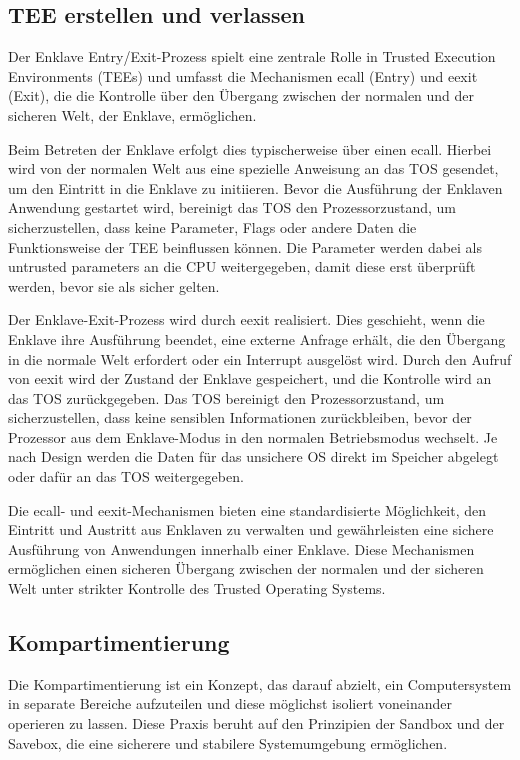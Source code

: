 \subsection{TEE erstellen und verlassen}
Der Enklave Entry/Exit-Prozess spielt eine zentrale Rolle in Trusted Execution Environments (TEEs) und umfasst die Mechanismen ecall (Entry) und eexit (Exit), die die Kontrolle über den Übergang zwischen der normalen und der sicheren Welt, der Enklave, ermöglichen.

Beim Betreten der Enklave erfolgt dies typischerweise über einen ecall. Hierbei wird von der normalen Welt aus eine spezielle Anweisung an das TOS gesendet, um den Eintritt in die Enklave zu initiieren. Bevor die Ausführung der Enklaven Anwendung gestartet wird, bereinigt das TOS den Prozessorzustand, um sicherzustellen, dass keine Parameter, Flags oder andere Daten die Funktionsweise der TEE beinflussen können. Die Parameter werden dabei als untrusted parameters an die CPU weitergegeben, damit diese erst überprüft werden, bevor sie als sicher gelten.

Der Enklave-Exit-Prozess wird durch eexit realisiert. Dies geschieht, wenn die Enklave ihre Ausführung beendet, eine externe Anfrage erhält, die den Übergang in die normale Welt erfordert oder ein Interrupt ausgelöst wird. Durch den Aufruf von eexit wird der Zustand der Enklave gespeichert, und die Kontrolle wird an das TOS zurückgegeben. Das TOS bereinigt den Prozessorzustand, um sicherzustellen, dass keine sensiblen Informationen zurückbleiben, bevor der Prozessor aus dem Enklave-Modus in den normalen Betriebsmodus wechselt. Je nach Design werden die Daten für das unsichere OS direkt im Speicher abgelegt oder dafür an das TOS weitergegeben.

Die ecall- und eexit-Mechanismen bieten eine standardisierte Möglichkeit, den Eintritt und Austritt aus Enklaven zu verwalten und gewährleisten eine sichere Ausführung von Anwendungen innerhalb einer Enklave. Diese Mechanismen ermöglichen einen sicheren Übergang zwischen der normalen und der sicheren Welt unter strikter Kontrolle des Trusted Operating Systems.
\subsection{Kompartimentierung}
Die Kompartimentierung ist ein Konzept, das darauf abzielt, ein Computersystem in separate Bereiche aufzuteilen und diese möglichst isoliert voneinander operieren zu lassen. Diese Praxis beruht auf den Prinzipien der Sandbox und der Savebox, die eine sicherere und stabilere Systemumgebung ermöglichen. 


